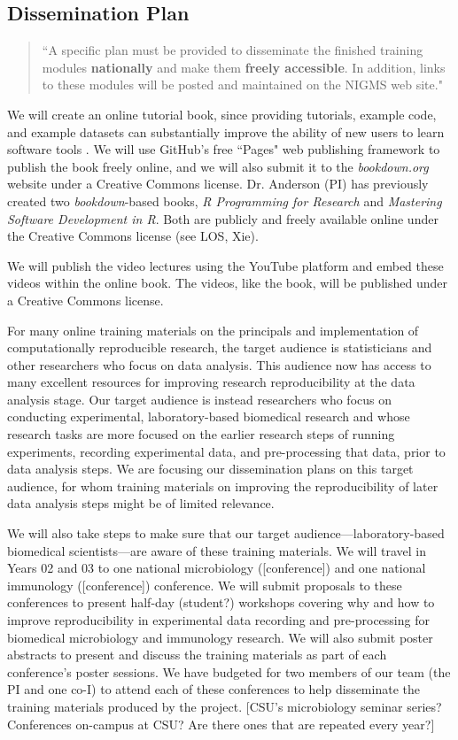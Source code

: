 \documentclass[pdftex,english,11pt,parskip=half]{scrartcl}
\begin{document}
\subsection{Dissemination Plan}

\begin{quotation}
``A specific plan must be provided to disseminate the finished training modules \textbf{nationally} and make them \textbf{freely accessible}. In addition, links to these modules will be posted and maintained on the NIGMS web site."
\end{quotation}

We will create an online tutorial book, since providing tutorials, example code, and example datasets can substantially improve the ability of new users to learn software tools \cite{list2017ten}. We will use GitHub's free ``Pages" web publishing framework to publish the book freely online, and we will also submit it to the \textit{bookdown.org} website under a Creative Commons license. Dr. Anderson (PI) has previously created two \textit{bookdown}-based books, \textit{R Programming for Research} and \textit{Mastering Software Development in R}. Both are publicly and freely available online under the Creative Commons license (see LOS, Xie). 

We will publish the video lectures using the YouTube platform and embed these videos within the online book. The videos, like the book, will be published under a Creative Commons license.

For many online training materials on the principals and implementation of computationally reproducible research, the target audience is statisticians and other researchers who focus on data analysis. This audience now has access to many excellent resources for improving research reproducibility at the data analysis stage. Our target audience is instead researchers who focus on conducting experimental, laboratory-based biomedical research and whose research tasks are more focused on the earlier research steps of running experiments, recording experimental data, and pre-processing that data, prior to data analysis steps. We are focusing our dissemination plans on this target audience, for whom training materials on improving the reproducibility of later data analysis steps might be of limited relevance.

We will also take steps to make sure that our target audience---laboratory-based biomedical scientists---are aware of these training materials. We will travel in Years 02 and 03 to one national microbiology ([conference]) and one national immunology ([conference]) conference. We will submit proposals to these conferences to present half-day (student?) workshops covering why and how to improve reproducibility in experimental data recording and pre-processing for biomedical microbiology and immunology research. We will also submit poster abstracts to present and discuss the training materials as part of each conference's poster sessions. We have budgeted for two members of our team (the PI and one co-I) to attend each of these conferences to help disseminate the training materials produced by the project. [CSU's microbiology seminar series? Conferences on-campus at CSU? Are there ones that are repeated every year?]
\end{document}
